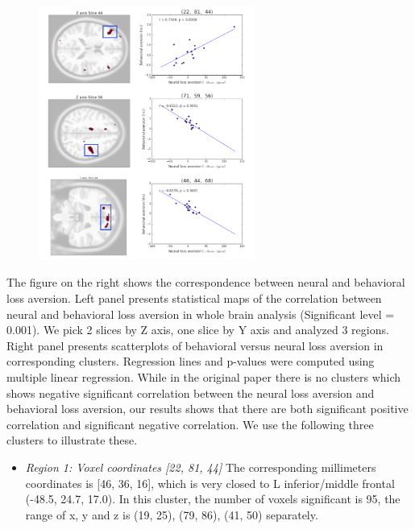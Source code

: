 \documentclass[11pt]{article}
\begin{document}
\begin{figure}
  \begin{center}
    \includegraphics[width=0.63\textwidth]{figures/Regression3/corr_neu_bah.png} 
  \end{center}
\end{figure}

The figure on the right shows the correspondence between neural and behavioral loss aversion. Left panel presents statistical maps of the correlation between neural and behavioral loss aversion in whole brain analysis (Significant level = 0.001). We pick 2 slices by Z axis, one slice by Y axis and analyzed 3 regions. Right panel presents scatterplots of behavioral versus neural loss aversion in corresponding clusters. Regression lines and p-values were computed using multiple linear regression. While in the original paper there is no clusters which shows negative significant correlation between the neural loss aversion and behavioral loss aversion, our results shows that there are both significant positive correlation and significant negative correlation. We use the following three clusters to illustrate these.

\begin{itemize}
\item \emph{Region 1: Voxel coordinates [22, 81, 44]} The corresponding millimeters coordinates is [46, 36, 16], which is very closed to L inferior/middle frontal (-48.5, 24.7, 17.0). In this cluster, the number of voxels significant is 95, the range of x, y and z is (19, 25), (79, 86), (41, 50) separately.
\end{itemize}
\end{document}
